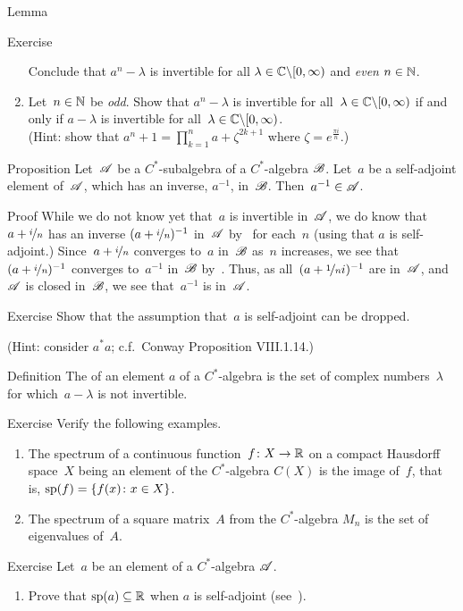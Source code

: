 \documentclass[a]{subfiles}
\begin{document}
\begin{parsec}
\begin{point}{Lemma}
\begin{point}{Exercise}
\begin{enumerate}
Conclude that $a^n-\lambda$ is invertible for all 
$\lambda\in\mathbb{C}\backslash[0,\infty)$ and \emph{even} $n\in\mathbb{N}$.
\item
Let~$n\in \mathbb{N}$ be \emph{odd}.
Show that $a^n-\lambda$ is invertible
for all~$\lambda\in \mathbb{C}\backslash[0,\infty)$
if and only if $a-\lambda$ is invertible
for all~$\lambda\in \mathbb{C}\backslash[0,\infty)$.\\
(Hint: show that
$a^n+1= \prod_{k=1}^n a+\zeta^{2k+1}$
where $\zeta=e^{\frac{\pi i}{n}}$.)
\end{enumerate}
\end{point}
\end{point}
\begin{point}{Proposition}%
Let~$\mathscr{A}$ be a $C^*$-subalgebra
of a $C^*$-algebra $\mathscr{B}$.
Let~$a$ be a self-adjoint element of~$\mathscr{A}$,
which has an inverse, $a^{-1}$, in~$\mathscr{B}$.
Then~$a^{-1}\in\mathscr{A}$.
\begin{point}{Proof}%
While we do not know yet that~$a$ is invertible in~$\mathscr{A}$,
we do know that~$a+\nicefrac{i}{n}$ 
has an inverse $(a+\nicefrac{i}{n})^{-1}$ in~$\mathscr{A}$
by~
for each~$n$
(using that $a$ is self-adjoint.)
Since~$a+\nicefrac{i}{n}$ converges to~$a$ in~$\mathscr{B}$ as~$n$ increases,
we see that $(a+\nicefrac{i}{n})^{-1}$ converges to~$a^{-1}$
in~$\mathscr{B}$ by~.
Thus, as all~$(a+\nicefrac{1}{n}i)^{-1}$ are in~$\mathscr{A}$,
and~$\mathscr{A}$ is closed in~$\mathscr{B}$,
we see that~$a^{-1}$ is in~$\mathscr{A}$.
\end{point}
\begin{point}{Exercise}%
Show that the assumption that~$a$ is self-adjoint
can be dropped. 

(Hint: consider $a^*a$; c.f.~Conway Proposition VIII.1.14.)
\end{point}
\end{point}
\begin{point}{Definition}%
The  of an element $a$
of a $C^*$-algebra
is the set 
of complex numbers~$\lambda$
for which~$a-\lambda$ is not invertible.
\begin{point}{Exercise}%
Verify the following examples.
\begin{enumerate}
\item
The spectrum of a continuous function~$f\colon X\to \mathbb{R}$
on a compact Hausdorff space~$X$
being an element of the $C^*$-algebra $C(X)$
is the image of~$f$, that is,
$\mathrm{sp}(f) = \{f(x)\colon x\in X\}$.
\item
The spectrum of a square matrix~$A$
from the $C^*$-algebra $M_n$
is the set of eigenvalues of~$A$.
\end{enumerate}
\end{point}
\begin{point}{Exercise}%
Let~$a$ be an element of a $C^*$-algebra $\mathscr{A}$.
\begin{enumerate}
\item
Prove that $\mathrm{sp}(a)\subseteq \mathbb{R}$ when $a$ is self-adjoint
(see~).


\end{enumerate}
\end{point}
\end{point}
\end{parsec}
\end{document}
